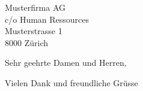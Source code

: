 \documentclass[
	version=last,
	SN, %
	refline=dateleft,
	firsthead=true,
	firstfoot=true,
	enlargefirstpage=true,
	backaddress=false,
	addrfield=alignedtop, %
	foldmarks=false,
	parskip=half-,
	fromalign=left,
	frommobilephone=true,
	fromemail=true,
	fromrule=afteraddress,
	subject=left,
	headsepline=false,
	footsepline=false,
	pagenumber=footright
]{scrlttr2}
\newcommand{\companyname}{Musterfirma AG}
\newcommand{\companyco}{c/o Human Ressources}
\newcommand{\companystreet}{Musterstrasse 1}
\newcommand{\companycity}{8000 Zürich}
\begin{document}
  \sffamily
  
  \begin{letter}{\companyname\\\companyco\\\companystreet\\\companycity}
    
    \opening{Sehr geehrte Damen und Herren,}
    
    \Blindtext
        
    \closing{Vielen Dank und freundliche Grüsse}
  \end{letter}
\end{document}
